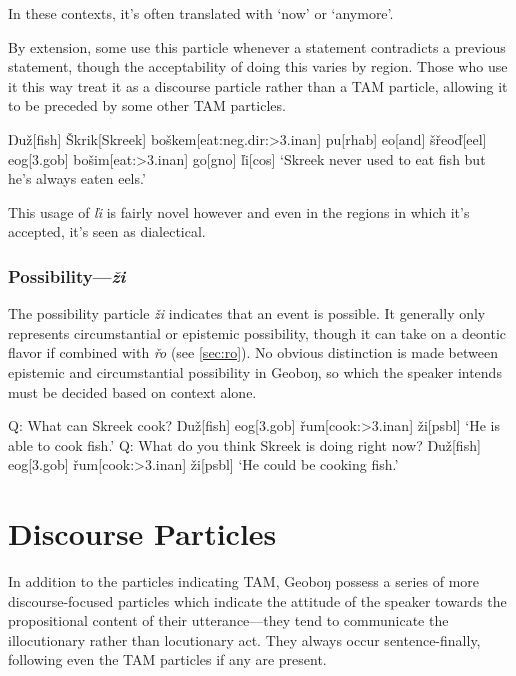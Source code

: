 \documentclass[a4paper,11pt,oneside,openany]{memoir}
\newcommand{\vd}{ď}
\newcommand{\vz}{ž}
\newcommand{\vs}{š}
\newcommand{\vr}{ř}
\newcommand{\vl}{ľ}
\newcommand{\vS}{Š}
\newcommand{\Engma}{Ŋ}
\newcommand{\engma}{ŋ}
\begin{document}
In these contexts, it's often translated with `now' or `anymore'.

By extension, some use this particle whenever a statement contradicts a previous statement, though the acceptability of doing this varies by region. Those who use it this way treat it as a discourse particle rather than a TAM particle, allowing it to be preceded by some other TAM particles.

\ex {}
\begingl
\Engma u\vz[fish]
\vS krik[Skreek]
bo\vs kem[eat:{\sc neg.dir:>3.inan}]
pu[\sc rhab]
eo[and]
\vs\vr eo\vd[eel]
eog[\sc 3.gob]
bo\vs im[eat:{\sc >3.inan}]
go[\sc gno]
\vl i[\sc cos]
\glft `Skreek never used to eat fish but he's always eaten eels.'
\endgl
\xe

This usage of \textit{\vl i} is fairly novel however and even in the regions in which it's accepted, it's seen as dialectical.

\subsubsection{Possibility---\textit{\vz i}}

The possibility particle \textit{\vz i} indicates that an event is possible. It generally only represents circumstantial or epistemic possibility, though it can take on a deontic flavor if combined with \textit{\vr o} (see \ref{sec:ro}). No obvious distinction is made between epistemic and circumstantial possibility in Geobo{\engma}, so which the speaker intends must be decided based on context alone.

\pex 
\a
\begingl
\glpreamble
Q: What can Skreek cook?
\endpreamble
{}
\Engma u\vz[fish]
eog[\sc 3.gob]
\vr um[cook:{\sc >3.inan}]
\vz i[\sc psbl]
\glft \phantom{A: }`He is able to cook fish.'
\endgl
\a 
\begingl
\glpreamble
Q: What do you think Skreek is doing right now?
\endpreamble
{}
\Engma u\vz[fish]
eog[\sc 3.gob]
\vr um[cook:{\sc >3.inan}]
\vz i[\sc psbl]
\glft \phantom{A: }`He could be cooking fish.'
\endgl
\xe

\section{Discourse Particles}

In addition to the particles indicating TAM, Geobo{\engma} possess a series of more discourse-focused particles which indicate the attitude of the speaker towards the propositional content of their utterance---they tend to communicate the illocutionary rather than locutionary act. They always occur sentence-finally, following even the TAM particles if any are present.
\end{document}
